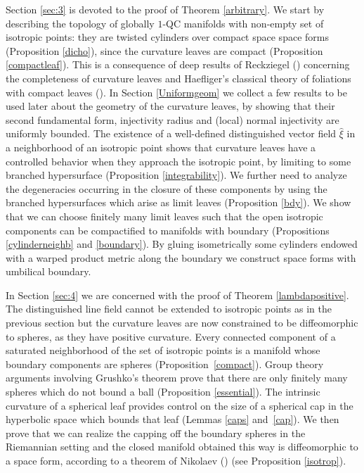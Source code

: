 \documentclass[10pt]{amsart}
\theoremstyle{definition}
\theoremstyle{remark}
\numberwithin{equation}{section}
\begin{document}
Section \ref{sec:3} is devoted to the proof of Theorem \ref{arbitrary}.
We start by describing the topology of globally $1$-QC manifolds with non-empty set of isotropic points:
they are twisted cylinders over compact space space forms (Proposition \ref{dicho}), since the curvature leaves
are compact (Proposition \ref{compactleaf}). This is a consequence of deep results of Reckziegel (\cite{Re2,Re}) concerning the completeness
of curvature leaves and Haefliger's classical theory of foliations with compact leaves (\cite{Hae}).
In Section \ref{Uniformgeom} we collect a few results to be used later about the geometry of the curvature leaves,
by showing that their second fundamental form, injectivity radius and (local) normal injectivity are uniformly bounded.
The existence of a well-defined distinguished vector field $\widehat{\xi}$ in a neighborhood of an isotropic point shows that
curvature leaves have a controlled behavior when they approach the isotropic point, by limiting to some branched
hypersurface (Proposition \ref{integrability}).
We further need to analyze the degeneracies occurring in the closure of these components by using the
branched hypersurfaces which arise as limit leaves (Proposition \ref{bdy}). We show that we can choose finitely many limit leaves
such that the open isotropic components can be compactified to manifolds with boundary (Propositions
\ref{cylinderneighb} and \ref{boundary}). By gluing isometrically some
cylinders endowed with a warped product metric along the boundary we construct space forms with umbilical boundary.

In Section \ref{sec:4} we are concerned with the proof of Theorem \ref{lambdapositive}. The distinguished line field
cannot be extended to isotropic points as in the previous section but the curvature leaves are now constrained to be
diffeomorphic to spheres, as they have positive curvature.
Every connected component of a saturated neighborhood of the set of isotropic points is a manifold whose boundary
components are spheres (\hbox{Proposition}~\ref{compact}).
Group theory arguments involving Grushko's theorem prove that there are only finitely many
spheres which do not bound a ball (Proposition \ref{essential}). The intrinsic curvature of a spherical leaf provides control on the
size of a spherical cap in the hyperbolic space which bounds that leaf (Lemmas \ref{caps} and~\ref{cap}). We then prove that
we can realize the capping off the boundary spheres in the Riemannian setting and the closed manifold obtained
this way is diffeomorphic to a space form, according to a theorem of Nikolaev (\cite{Nik}) (see Proposition \ref{isotrop}).
\end{document}
